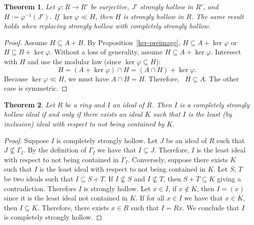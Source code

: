 \documentclass[11pt,english]{amsart}
\newtheorem{theorem}{Theorem}[section]
\theoremstyle{definition}
\numberwithin{equation}{section}
\theoremstyle{remark}
\begin{document}
\begin{theorem}
Let $\varphi:R\to R'$ be surjective, $J'$ strongly hollow in $R'$, and $H:=\varphi^{-1}(J')$. If $\ker\varphi\ll H$, then $H$ is strongly hollow in $R$. The same result holds when replacing strongly hollow with completely strongly hollow.
\end{theorem}

\begin{proof}
Assume $H\subseteq A+B$. By Proposition~\ref{ker-preimage}, $H\subseteq A+\ker\varphi$ or $H\subseteq B+\ker\varphi$. Without a loss of generality, assume $H\subseteq A+\ker\varphi$. Intersect with $H$ and use the modular law (since $\ker\varphi\subseteq H$):
\[
  H=(A+\ker\varphi)\cap H=(A\cap H)+\ker\varphi.
\]
Because $\ker\varphi\ll H$, we must have $A\cap H=H$. Therefore, \ $H\subseteq A$. The other case is symmetric.
\end{proof}


\begin{theorem}\label{least}
    Let $R$ be a ring and $I$ an ideal of $R$. Then $I$ is a completely strongly hollow ideal if and only if there exists an ideal $K$ such that $I$ is the least (by inclusion) ideal with respect to not being contained by $K$.
\end{theorem}
\begin{proof}
    Suppose $I$ is completely strongly hollow. Let $J$ be an ideal of $R$ such that $J\not\subseteq \Gamma_I$. By the definition of $\Gamma_I$ we have that $I\subseteq J$. Therefore, $I$ is the least ideal with respect to not being contained in $\Gamma_I$. Conversely, suppose there exists $K$ such that $I$ is the least ideal with respect to not being contained in $K$. Let $S$, $T$ be two ideals such that $I\subseteq S+T$. If $I\not\subseteq S$ and $I\not\subseteq T$, then $S+T\subseteq K$ giving a contradiction. Therefore $I$ is strongly hollow. Let $x\in I$, if $x\not\in K$, then $I=(x)$ since it is the least ideal not contained in $K$. If for all $x\in I$ we have that $x\in K$, then $I\subseteq K$. Therefore, there exists $x\in R$ such that $I=Rx$. We conclude that $I$ is completely strongly hollow.
\end{proof}
\end{document}
